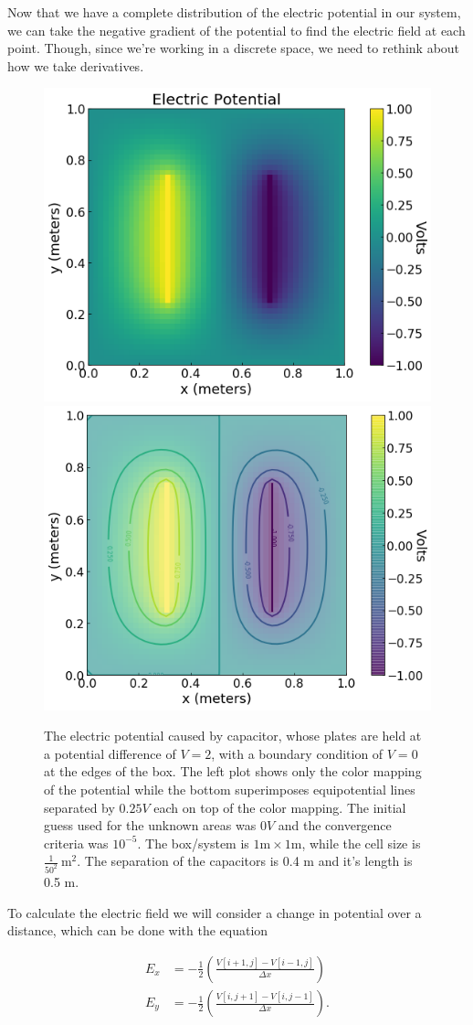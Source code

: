 \documentclass{report}
\begin{document}
            Now that we have a complete distribution of the electric potential in our system, we can take the negative gradient of the potential to find the electric field at each point.  Though, since we're working in a discrete space, we need to rethink about how we take derivatives.

            \begin{figure}[t]
                \centering
                \includegraphics[width=0.45\linewidth]{images/PotentialField.png}
                \includegraphics[width=0.45\linewidth]{images/PotentialFieldEquipotentials.png}
                \caption{The electric potential caused by capacitor, whose plates are held at a potential difference of $V=2$, with a boundary condition of $V=0$ at the edges of the box. The left plot shows only the color mapping of the potential while the bottom superimposes equipotential lines separated by $0.25 V$ each on top of the color mapping. The initial guess used for the unknown areas was $0 V$ and the convergence criteria was $10^{-5}$. The box/system is $1 \mathrm{m} \times 1 \mathrm{m}$, while the cell size is $\frac{1}{50^2} \ \mathrm{m^2}$. The separation of the capacitors is 0.4 m and it's length is 0.5 m.}
                \label{fig:PotentialField}
            \end{figure}
            
            To calculate the electric field we will consider a change in potential over a distance, which can be done with the equation
            
            \begin{equation} \label{eq:efieldcomponents}
                \begin{split}
                    E_x &=-\frac{1}{2}\left(\frac{V[i+1,j]-V[i-1,j]}{\Delta x}\right) \\
                    E_y &=-\frac{1}{2}\left(\frac{V[i,j+1]-V[i,j-1]}{\Delta x}\right).
                \end{split}
            \end{equation}
            
\end{document}
